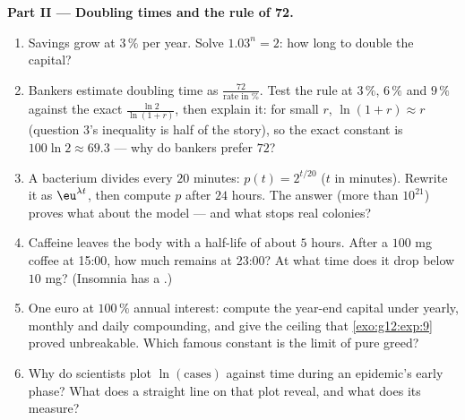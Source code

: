 \begin{problem}
\medskip
\noindent\textbf{Part II --- Doubling times and the rule of
72.}
\begin{enumerate}[resume]
  \item Savings grow at $3\,\%$ per year. Solve
        $1.03^n = 2$: how long to double the capital?
  \item Bankers estimate doubling time as
        $\frac{72}{\text{rate in }\%}$. Test the rule at
        $3\,\%$, $6\,\%$ and $9\,\%$ against the exact
        $\frac{\ln 2}{\ln(1 + r)}$, then explain it: for small
        $r$, $\ln(1 + r) \approx r$ (question 3's inequality is
        half of the story), so the exact constant is
        $100 \ln 2 \approx 69.3$ --- why do bankers prefer
        $72$?
  \item A bacterium divides every $20$ minutes:
        $p(t) = 2^{t/20}$ ($t$ in minutes). Rewrite it as
        $\eu^{\lambda t}$, then compute $p$ after $24$ hours.
        The answer (more than $10^{21}$) proves what about the
        model --- and what stops real colonies?
  \item Caffeine leaves the body with a half-life of about $5$
        hours. After a $100$ mg coffee at 15:00, how much
        remains at 23:00? At what time does it drop below
        $10$ mg? (Insomnia has a .)
  \item One euro at $100\,\%$ annual interest: compute the
        year-end capital under yearly, monthly and daily
        compounding, and give the ceiling that
        \cref{exo:g12:exp:9} proved unbreakable. Which famous
        constant is the limit of pure greed?
  \item Why do scientists plot $\ln(\text{cases})$ against
        time during an epidemic's early phase? What does a
        straight line on that plot reveal, and what does its
         measure?
\end{enumerate}


\end{problem}
